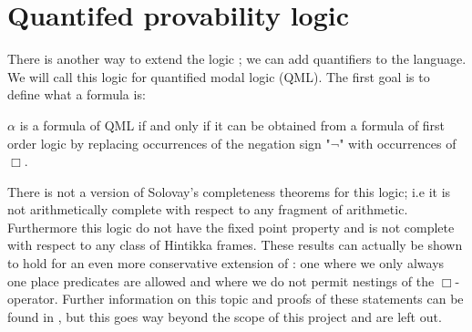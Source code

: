 \documentclass[../main.tex]{subfiles}
\begin{document}
\section{Quantifed provability logic}
There is another way to extend the logic \GL; we can add quantifiers to the
language. We will call this logic for quantified modal logic (QML). The first
goal is to define what a formula is:
\begin{defi}
	$\alpha$ is a formula of QML if and only if it can be obtained from a
	formula of first order logic by
	replacing occurrences of the negation sign "$\neg$" with occurrences of
	$\Box$. 
\end{defi}

	There is not a version of Solovay's completeness theorems for this
	logic; i.e it is not arithmetically complete with respect to any
	fragment of arithmetic. Furthermore this logic  do not have the fixed point property and
	is not complete with respect to any class of Hintikka frames. These
	results can actually be shown to hold for an even more conservative
	extension of \GL: one where we only always one place predicates are
	allowed and where we do not permit nestings of the $\Box$-operator. Further
	information on this topic and proofs of these statements can be found
	in \parencite{Boolos1993}, but this goes way beyond the scope of this
	project and are left out.
	
\end{document}
